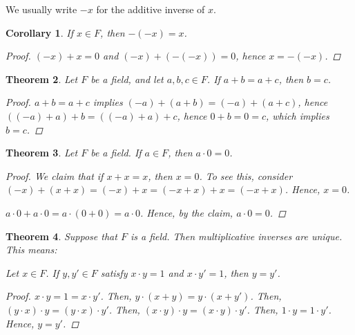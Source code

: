 \documentclass[11pt]{article}
\newtheorem{theorem}{Theorem}[section]
\newtheorem{corollary}[theorem]{Corollary}
\theoremstyle{definition}
\numberwithin{equation}{subsection}
\begin{document}
We usually write $-x$ for the additive inverse of $x$.

\begin{corollary}
	If $x\in F$, then $-(-x)=x$.

\begin{proof}
$(-x)+x=0$ and $(-x)+(-(-x))=0$, hence $x=-(-x)$. 

\renewcommand\qedsymbol{QED}
\end{proof}

\end{corollary}



\begin{theorem}
	Let $F$ be a field, and let $a,b,c\in F$. If $a + b = a + c$, then $b = c$.
    
\begin{proof}
$a+b=a+c$ implies $(-a)+(a+b)=(-a)+(a+c)$, hence $((-a)+a)+b=((-a)+a)+c$, hence $0+b=0=c$, which implies $b=c$.

\renewcommand\qedsymbol{QED}
\end{proof}

\end{theorem}



\begin{theorem}
	Let $F$ be a field. If $a\in F$, then $a \cdot 0 = 0$.
    
\begin{proof}
We claim that if $x+x=x$, then $x=0$. To see this, consider $(-x)+(x+x)=(-x)+x=(-x+x)+x=(-x+x)$. Hence, $x=0$.

$a\cdot0+a\cdot0=a\cdot(0+0)=a\cdot0$. Hence, by the claim, $a\cdot0=0$.

\renewcommand\qedsymbol{QED}
\end{proof}


\end{theorem}




\begin{theorem}
	Suppose that $F$ is a field.  Then multiplicative inverses are unique.  This means: 
	
	Let $x \in F$.  If $y, y' \in F$ satisfy $x \cdot y = 1$ and $x \cdot y' = 1$, then $y = y'$.
    
\begin{proof}
$x\cdot y=1=x\cdot y'$. Then, $y\cdot (x+y)=y\cdot (x+y')$. Then, $(y \cdot x)\cdot y=(y \cdot x)\cdot y'$. Then, $(x \cdot y)\cdot y=(x \cdot y)\cdot y'$. Then, $1\cdot y=1\cdot y'$. Hence, $y=y'$.

\renewcommand\qedsymbol{QED}
\end{proof}


\end{theorem}
\end{document}
